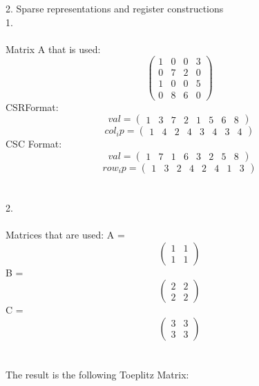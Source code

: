 \documentclass[10pt]{report}
\begin{document}
\pagebreak
{\Huge 2. Sparse representations and register constructions}
\\[0.5in]
{\Huge 1.}
\\~\\
Matrix A that is used:
\newline
$$\left(\begin{array}{cccc} 1 & 0 & 0 & 3\\ 0 & 7 & 2 & 0\\ 1 & 0 & 0 & 5\\ 0 & 8 & 6 & 0 \end{array}\right)$$
CSRFormat:
\newline
$$val=\left(\begin{array}{c|c|c|c|c|c|c|c} 1 & 3 & 7 & 2 & 1 & 5 & 6 & 8 \end{array}\right)$$
$$col_ip=\left(\begin{array}{c|c|c|c|c|c|c|c} 1 & 4 & 2 & 4 & 3 & 4 & 3 & 4 \end{array}\right)$$
CSC Format:
\newline
$$val=\left(\begin{array}{c|c|c|c|c|c|c|c} 1 & 7 & 1 & 6 & 3 & 2 & 5 & 8 \end{array}\right)$$
$$row_ip=\left(\begin{array}{c|c|c|c|c|c|c|c} 1 & 3 & 2 & 4 & 2 & 4 & 1 & 3 \end{array}\right)$$
\\~\\
{\Huge 2.}
\\~\\
Matrices that are used:
\newline
\newline
A = $$\left(\begin{array}{cc} 1 & 1\\ 1 & 1 \end{array}\right)$$
\newline
B =  $$\left(\begin{array}{cc} 2 & 2\\ 2 & 2 \end{array}\right)$$
\newline
C =  $$\left(\begin{array}{cc} 3 & 3\\ 3 & 3 \end{array}\right)$$
\\~\\
The result is the following Toeplitz Matrix:
\newline
\end{document}
